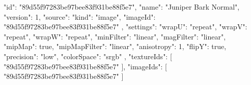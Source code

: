 {
  "id": "89d55f97283be97bee83f931be88f5e7",
  "name": "Juniper Bark Normal",
  "version": 1,
  "source": {
    "kind": "image",
    "imageId": "89d55f97283be97bee83f931be88f5e7"
  },
  "settings": {
    "wrapU": "repeat",
    "wrapV": "repeat",
    "wrapW": "repeat",
    "minFilter": "linear",
    "magFilter": "linear",
    "mipMap": true,
    "mipMapFilter": "linear",
    "anisotropy": 1,
    "flipY": true,
    "precision": "low",
    "colorSpace": "srgb"
  },
  "textureIds": [
    "89d55f97283be97bee83f931be88f5e7"
  ],
  "imageIds": [
    "89d55f97283be97bee83f931be88f5e7"
  ]
}
